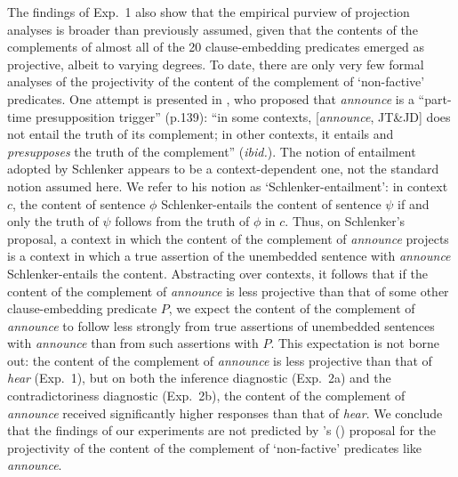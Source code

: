 \documentclass[11pt,fleqn]{article}
\newcommand{\6}{\mbox{$[\hspace*{-.6mm}[$}}
\newcommand{\9}{\mbox{$]\hspace*{-.6mm}]$}}
\newcommand{\citetpos}[1]{\citeauthor{#1}'s (\citeyear{#1})}
\begin{document}
{The findings of Exp.~1 also show that the empirical purview of projection analyses is broader than previously assumed, given that the contents of the complements of almost all of the 20 clause-embedding predicates emerged as projective, albeit to varying degrees. To date, there are only very few formal analyses of the projectivity of the content of the complement of `non-factive' predicates.  One attempt is presented in \citealt{schlenker10}, who proposed that {\em announce} is a ``part-time presupposition trigger'' (p.139): ``in some contexts, [{\em announce}, JT\&JD] does not entail the truth of its complement; in other contexts, it entails and {\em presupposes} the truth of the complement'' ({\em ibid.}). The notion of entailment adopted by Schlenker appears to be a context-dependent one, not the standard notion assumed here. We refer to his notion as `Schlenker-entailment': in context $c$, the content of sentence $\phi$ Schlenker-entails the content of sentence $\psi$ if and only the truth of $\psi$ follows from the truth of $\phi$ in $c$.  Thus, on Schlenker's proposal, a context in which the content of the complement of {\em announce} projects is a context in which a true assertion of the unembedded sentence with {\em announce} Schlenker-entails the content. Abstracting over contexts, it follows that if the content of the complement of {\em announce} is less projective than that of some other clause-embedding predicate $P$, we expect the content of the complement of {\em announce} to follow less strongly from true assertions of unembedded sentences with {\em announce} than from such assertions with $P$. This expectation is not borne out: the content of the complement of {\em announce} is less projective than that of {\em hear} (Exp.~1), but on both the inference diagnostic (Exp.~2a) and the contradictoriness diagnostic (Exp.~2b), the content of the complement of {\em announce} received significantly higher responses than that of {\em hear}. We conclude that the findings of our experiments are not predicted by \citetpos{schlenker10} proposal for the projectivity of the content of the complement of `non-factive' predicates like {\em announce}.

}
\end{document}
